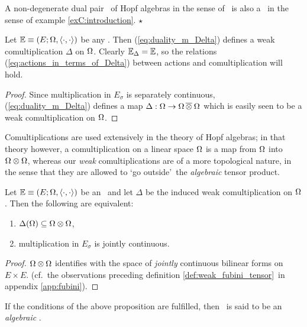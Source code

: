\begin{exC}  \rm
  A non-degenerate dual pair \pairAB\ of Hopf algebras in the sense of \cite{Fons:DPHA}\
  is also a \dpa\ in the sense of example \ref{exC:introduction}.
  \hfill $\star$
\end{exC}


\begin{prop} \label{prop:induced_comult}
  Let\/ $\mathbb{E} \equiv (E; \Omega, \langle\cdot, \cdot\rangle)$ be any \context\@.
  Then (\ref{eq:duality_m_Delta}) defines a weak comultiplication
  $\Delta$ on\/ $\Omega$. Clearly $\mathbb{E}_{\Delta} = \mathbb{E}$,
  so the relations (\ref{eq:actions_in_terms_of_Delta}) between
  actions and comultiplication will hold.
\end{prop}
\begin{proof}
  Since multiplication in $E_\sigma$ is separately continuous,
  (\ref{eq:duality_m_Delta}) defines a map
  $\Delta : \Omega \rightarrow \Omega \,\overline{\otimes}\: \Omega$ which
  is easily seen to be a weak comultiplication on $\Omega$.
\end{proof}
\vspace{2ex}


{\small
Comultiplications are used extensively in the theory of Hopf algebras;
in that theory however, a comultiplication on a linear space $\Omega$ is a map
from $\Omega$ into $\Omega \otimes \Omega$, whereas our {\em weak\/} comultiplications
are of a more topological nature, in the sense that they are allowed
to \lq go outside\rq\ the {\em algebraic\/} tensor product.}


\begin{prop} \label{prop:algebraic_and_cont_prod}
  Let\/ $\mathbb{E} \equiv (E; \Omega, \langle\cdot, \cdot\rangle)$ be an \context\ and let $\Delta$ be the
  induced weak comultiplication on $\Omega$. Then the following are equivalent:
  \begin{enumerate}
    \item $\Delta(\Omega) \subseteq \Omega\otimes\Omega$,
    \item multiplication in $E_\sigma$ is jointly continuous.
  \end{enumerate}
\end{prop}
\begin{proof}
  $\Omega\otimes\Omega$ identifies with the space of {\em jointly\/} continuous bilinear
  forms on $E\times E$.
  (cf.\ the observations preceding definition \ref{def:weak_fubini_tensor}\
  in appendix \ref{app:fubini}).
\end{proof}


\begin{defn} \label{def:algebraic_context}
  If the conditions of the above proposition are fulfilled,
  then\/ \EE\ is said to be an {\em algebraic\/} \context.
\end{defn}


